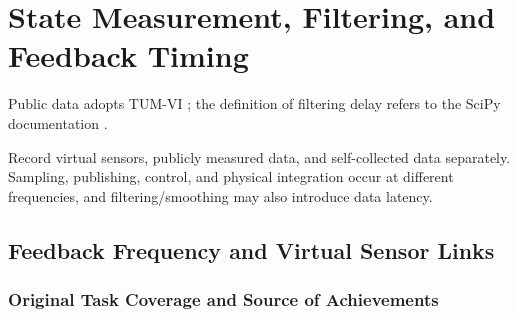 \chapter{State Measurement, Filtering, and Feedback Timing}
Public data adopts TUM-VI \cite{tumvi}; the definition of filtering delay refers to the SciPy documentation \cite{scipy}.


Record virtual sensors, publicly measured data, and self-collected data separately. Sampling, publishing, control, and physical integration occur at different frequencies, and filtering/smoothing may also introduce data latency.

\section{Feedback Frequency and Virtual Sensor Links}

\label{stage:s05}

\subsection{Original Task Coverage and Source of Achievements}\label{s05-detail-1}

